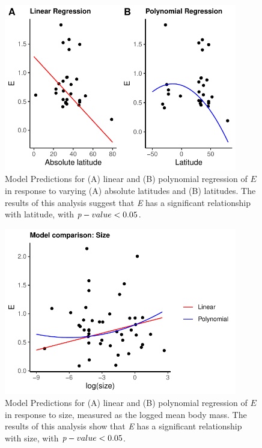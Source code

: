 \documentclass[11pt]{article}
\begin{document}
\begin{flushleft}
\begin{figure}[!htbp]
    \centering
    \includegraphics[width=4in]{compare_lat_grid.pdf}
    \caption{\label{fig:5} Model Predictions for (A) linear and (B) polynomial regression of \emph{$E$} in response to varying (A) absolute latitudes and (B) latitudes. The results of this analysis suggest that \emph{E} has a significant relationship with latitude, with $\emph{p}-value < 0.05$.}
\end{figure}

\begin{figure}[!htbp]
    \centering
    \includegraphics[width=4in]{compare_size.pdf}
    \caption{\label{fig:6} Model Predictions for (A) linear and (B) polynomial regression of $E$ in response to size, measured as the logged mean body mass. The results of this analysis show that \emph{E} has a significant relationship with size, with $\emph{p}-value < 0.05$.}
\end{figure}


\end{flushleft}
\end{document}
